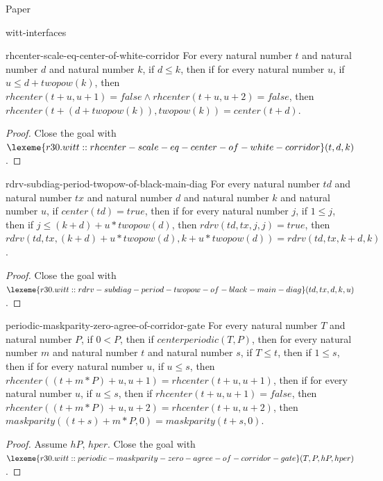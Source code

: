 \begin{lexlean}{Paper}
\begin{section}{witt-interfaces}
  \begin{theorem}{rhcenter-scale-eq-center-of-white-corridor}
  For every natural number \(t\) and natural number \(d\) and natural number \(k\), if \(d ≤ k\), then if for every natural number \(u\), if \(u ≤ d + twopow(k)\), then \(rhcenter(t + u, u + 1) = false ∧ rhcenter(t + u, u + 2) = false\), then \(rhcenter(t + (d + twopow(k)), twopow(k)) = center(t + d)\).
  \begin{proof}
  Close the goal with \(\lexeme{r30.witt::rhcenter-scale-eq-center-of-white-corridor}(t, d, k)\).
  \end{proof}
  \end{theorem}

  \begin{theorem}{rdrv-subdiag-period-twopow-of-black-main-diag}
  For every natural number \(td\) and natural number \(tx\) and natural number \(d\) and natural number \(k\) and natural number \(u\), if \(center(td) = true\), then if for every natural number \(j\), if \(1 ≤ j\), then if \(j ≤ (k + d) + u * twopow(d)\), then \(rdrv(td, tx, j, j) = true\), then \(rdrv(td, tx, (k + d) + u * twopow(d), k + u * twopow(d)) = rdrv(td, tx, k + d, k)\).
  \begin{proof}
  Close the goal with \(\lexeme{r30.witt::rdrv-subdiag-period-twopow-of-black-main-diag}(td, tx, d, k, u)\).
  \end{proof}
  \end{theorem}

  \begin{theorem}{periodic-maskparity-zero-agree-of-corridor-gate}
  For every natural number \(T\) and natural number \(P\), if \(0 < P\), then if \(centerperiodic(T, P)\), then for every natural number \(m\) and natural number \(t\) and natural number \(s\), if \(T ≤ t\), then if \(1 ≤ s\), then if for every natural number \(u\), if \(u ≤ s\), then \(rhcenter((t + m * P) + u, u + 1) = rhcenter(t + u, u + 1)\), then if for every natural number \(u\), if \(u ≤ s\), then if \(rhcenter(t + u, u + 1) = false\), then \(rhcenter((t + m * P) + u, u + 2) = rhcenter(t + u, u + 2)\), then \(maskparity((t + s) + m * P, 0) = maskparity(t + s, 0)\).
  \begin{proof}
  Assume \(hP\), \(hper\).
  Close the goal with \(\lexeme{r30.witt::periodic-maskparity-zero-agree-of-corridor-gate}(T, P, hP, hper)\).
  \end{proof}
  \end{theorem}


\end{section}
\end{lexlean}

